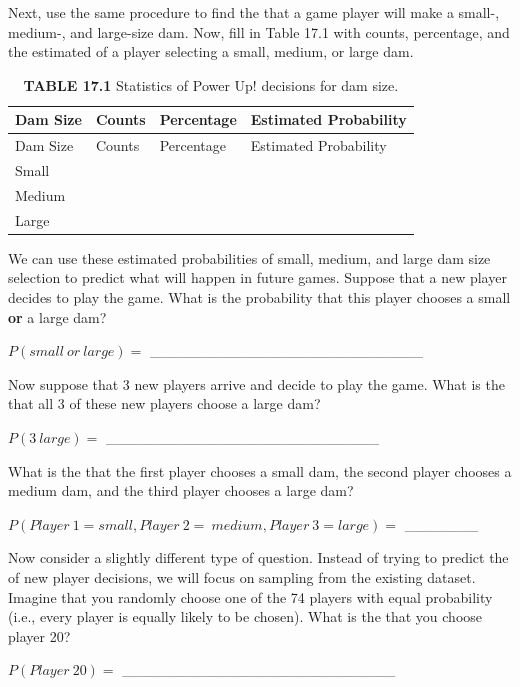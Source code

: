 \documentclass[
  openany]{krantz}
\begin{document}
Next, use the same procedure to find the  that a game player will make a small-, medium-, and large-size dam.
Now, fill in Table 17.1 with counts, percentage, and the estimated  of a player selecting a small, medium, or large dam.

\begin{longtable}[]{@{}llll@{}}
\caption{\textbf{TABLE 17.1} Statistics of Power Up! decisions for dam size.}\tabularnewline
\toprule
Dam Size & Counts & Percentage & Estimated Probability \\
\midrule
\endfirsthead
\toprule
Dam Size & Counts & Percentage & Estimated Probability \\
\midrule
\endhead
Small & & & \\
Medium & & & \\
Large & & & \\
\bottomrule
\end{longtable}

We can use these estimated probabilities of small, medium, and large dam size selection to predict what will happen in future games.
Suppose that a new player decides to play the game.
What is the probability that this player chooses a small \textbf{or} a large dam?

\(P(small\:or\:large) =\) \_\_\_\_\_\_\_\_\_\_\_\_\_\_\_\_\_\_\_\_\_\_\_\_\_\_

Now suppose that 3 new players arrive and decide to play the game.
What is the  that all 3 of these new players choose a large dam?

\(P(3\:large) =\) \_\_\_\_\_\_\_\_\_\_\_\_\_\_\_\_\_\_\_\_\_\_\_\_\_\_

What is the  that the first player chooses a small dam, the second player chooses a medium dam, and the third player chooses a large dam?

\(P(Player\:1 = small,Player\:2 = \:medium,Player\:3 = large) =\) \_\_\_\_\_\_\_

Now consider a slightly different type of question.
Instead of trying to predict the  of new player decisions, we will focus on sampling from the existing dataset.
Imagine that you randomly choose one of the 74 players with equal probability (i.e., every player is equally likely to be chosen).
What is the  that you choose player 20?

\(P(Player\:20) =\) \_\_\_\_\_\_\_\_\_\_\_\_\_\_\_\_\_\_\_\_\_\_\_\_\_\_
\end{document}
